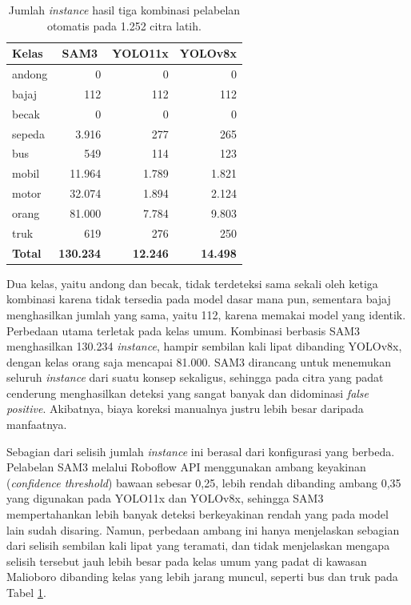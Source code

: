 \begin{table}[h]
    \centering
    \caption{Jumlah \textit{instance} hasil tiga kombinasi pelabelan otomatis pada 1.252 citra latih.}
    \label{tab:perbandingan_autolabel}
    \begin{tabular}{|l|r|r|r|}
        \hline
        \textbf{Kelas} & \multicolumn{1}{|c|}{\textbf{SAM3}} & \multicolumn{1}{c|}{\textbf{YOLO11x}} & \multicolumn{1}{c|}{\textbf{YOLOv8x}} \\
        \hline \hline
        andong & 0 & 0 & 0 \\
        bajaj & 112 & 112 & 112 \\
        becak & 0 & 0 & 0 \\
        sepeda & 3.916 & 277 & 265 \\
        bus & 549 & 114 & 123 \\
        mobil & 11.964 & 1.789 & 1.821 \\
        motor & 32.074 & 1.894 & 2.124 \\
        orang & 81.000 & 7.784 & 9.803 \\
        truk & 619 & 276 & 250 \\
        \hline
        \textbf{Total} & \textbf{130.234} & \textbf{12.246} & \textbf{14.498} \\
        \hline
    \end{tabular}
\end{table}

Dua kelas, yaitu andong dan becak, tidak terdeteksi sama sekali oleh ketiga kombinasi 
karena tidak tersedia pada model dasar mana pun, sementara bajaj menghasilkan jumlah 
yang sama, yaitu 112, karena memakai model yang identik. Perbedaan utama terletak pada 
kelas umum. Kombinasi berbasis SAM3 menghasilkan 130.234 \textit{instance}, hampir 
sembilan kali lipat dibanding YOLOv8x, dengan kelas orang saja mencapai 81.000. SAM3 
dirancang untuk menemukan seluruh \textit{instance} dari suatu konsep sekaligus, sehingga 
pada citra yang padat cenderung menghasilkan deteksi yang sangat banyak dan didominasi 
\textit{false positive}. Akibatnya, biaya koreksi manualnya justru lebih besar daripada 
manfaatnya.

Sebagian dari selisih jumlah \textit{instance} ini berasal dari konfigurasi yang berbeda. 
Pelabelan SAM3 melalui Roboflow API menggunakan ambang keyakinan (\textit{confidence 
threshold}) bawaan sebesar 0,25, lebih rendah dibanding ambang 0,35 yang digunakan pada 
YOLO11x dan YOLOv8x, sehingga SAM3 mempertahankan lebih banyak deteksi berkeyakinan rendah 
yang pada model lain sudah disaring. Namun, perbedaan ambang ini hanya menjelaskan 
sebagian dari selisih sembilan kali lipat yang teramati, dan tidak menjelaskan mengapa 
selisih tersebut jauh lebih besar pada kelas umum yang padat di kawasan Malioboro 
dibanding kelas yang lebih jarang muncul, seperti bus dan truk pada Tabel 
\ref{tab:perbandingan_autolabel}.

